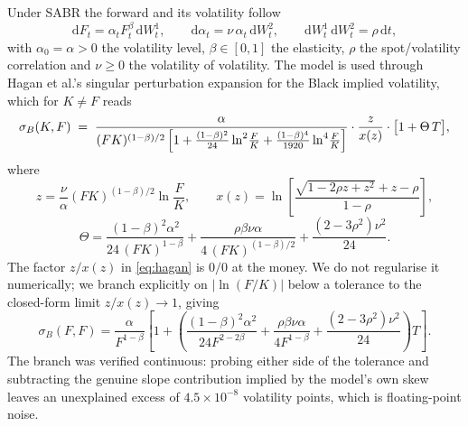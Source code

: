 \documentclass[11pt]{article}
\begin{document}
Under SABR \citep{hagan2002} the forward and its volatility follow
\begin{equation}
  \mathrm{d}F_t = \alpha_t F_t^{\beta}\,\mathrm{d}W^{1}_t,
  \qquad
  \mathrm{d}\alpha_t = \nu\,\alpha_t\,\mathrm{d}W^{2}_t,
  \qquad
  \mathrm{d}W^{1}_t\,\mathrm{d}W^{2}_t = \rho\,\mathrm{d}t ,
  \label{eq:sabr-sde}
\end{equation}
with $\alpha_0=\alpha>0$ the volatility level, $\beta\in[0,1]$ the elasticity, $\rho$
the spot/volatility correlation and $\nu\ge 0$ the volatility of volatility. The model
is used through Hagan et al.'s singular perturbation expansion for the Black implied
volatility, which for $K\neq F$ reads
\begin{equation}
  \sigma_{B}(K,F)\;=\;
  \frac{\alpha}{(FK)^{(1-\beta)/2}\,
        \Bigl[1+\frac{(1-\beta)^2}{24}\ln^{2}\!\frac{F}{K}
               +\frac{(1-\beta)^4}{1920}\ln^{4}\!\frac{F}{K}\Bigr]}
  \cdot \frac{z}{x(z)} \cdot \bigl[1+\Theta\,T\bigr],
  \label{eq:hagan}
\end{equation}
where
\begin{equation}
  z=\frac{\nu}{\alpha}(FK)^{(1-\beta)/2}\ln\!\frac{F}{K},
  \qquad
  x(z)=\ln\!\left[\frac{\sqrt{1-2\rho z+z^{2}}+z-\rho}{1-\rho}\right],
  \label{eq:zx}
\end{equation}
\begin{equation}
  \Theta=\frac{(1-\beta)^{2}\alpha^{2}}{24\,(FK)^{1-\beta}}
        +\frac{\rho\beta\nu\alpha}{4\,(FK)^{(1-\beta)/2}}
        +\frac{(2-3\rho^{2})\nu^{2}}{24}.
  \label{eq:theta}
\end{equation}
The factor $z/x(z)$ in \eqref{eq:hagan} is $0/0$ at the money. We do not regularise it
numerically; we branch explicitly on $|\ln(F/K)|$ below a tolerance to the closed-form
limit $z/x(z)\to 1$, giving
\begin{equation}
  \sigma_{B}(F,F)=\frac{\alpha}{F^{1-\beta}}
  \left[1+\left(\frac{(1-\beta)^{2}\alpha^{2}}{24F^{2-2\beta}}
        +\frac{\rho\beta\nu\alpha}{4F^{1-\beta}}
        +\frac{(2-3\rho^{2})\nu^{2}}{24}\right)T\right].
  \label{eq:atm}
\end{equation}
The branch was verified continuous: probing either side of the tolerance and subtracting
the genuine slope contribution implied by the model's own skew leaves an unexplained
excess of $4.5\times10^{-8}$ volatility points, which is floating-point noise.
\end{document}
